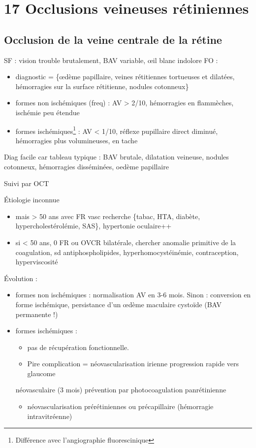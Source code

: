 \documentclass[11pt]{article}
\begin{document}
\section{17 Occlusions veineuses rétiniennes}
\label{sec:org367216b}
\subsection{Occlusion de la veine centrale de la rétine}
\label{sec:org1b4c7c7}
SF : vision trouble brutalement, BAV variable, \oe{}il blanc indolore
FO : 
\begin{itemize}
\item diagnostic = \{\oe{}dème papillaire, veines rétitiennes tortueuses et dilatées,
hémorragies sur la surface rétitienne, nodules cotonneux\}
\item formes non ischémiques (freq) : AV > 2/10, hémorragies en flammèches, ischémie
peu étendue
\item formes ischémiques\footnote{Différence avec l'angiographie fluorescinique} : AV < 1/10, réflexe pupillaire direct diminué, hémorragies
plus volumineuses, en tache
\end{itemize}

\begin{tcolorbox}
Diag facile car tableau typique : BAV brutale, dilatation veineuse, nodules cotonneux,
hémorragies disséminées, oedème papillaire
\end{tcolorbox}

Suivi par OCT

Étiologie inconnue 
\begin{itemize}
\item mais > 50 ans avec FR vasc \thus recherche \{tabac, HTA, diabète, hypercholestérolémie, SAS\}, hypertonie oculaire++
\item si < 50 ans, 0 FR ou OVCR bilatérale, chercher anomalie primitive de la
coagulation, sd antiphospholipides, hyperhomocystéinémie, contraception, hyperviscosité
\end{itemize}

Évolution :
\begin{itemize}
\item formes non ischémiques : normalisation AV en 3-6 mois. Sinon : conversion en
forme ischémique, persistance d'un \oe{}dème maculaire cystoïde (BAV permanente !)
\item formes ischémiques : 
\begin{itemize}
\item pas de récupération fonctionnelle.
\item Pire complication = néovascularisation irienne \thus progression rapide vers glaucome
\end{itemize}
néovasculaire (3 mois) \thus prévention par photocoagulation panrétinienne
\begin{itemize}
\item néovascularisation prérétiniennes ou précapillaire (hémorragie intravitréenne)
\end{itemize}
\end{itemize}
\end{document}
